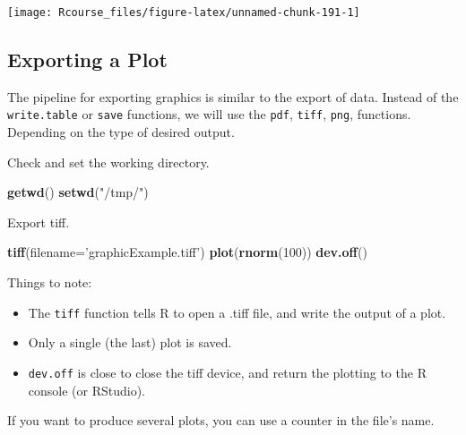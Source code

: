 \documentclass[]{book}
\newenvironment{Shaded}{\begin{snugshade}}{\end{snugshade}}
\newcommand{\KeywordTok}[1]{\textcolor[rgb]{0.13,0.29,0.53}{\textbf{{#1}}}}
\newcommand{\DataTypeTok}[1]{\textcolor[rgb]{0.13,0.29,0.53}{{#1}}}
\newcommand{\DecValTok}[1]{\textcolor[rgb]{0.00,0.00,0.81}{{#1}}}
\newcommand{\StringTok}[1]{\textcolor[rgb]{0.31,0.60,0.02}{{#1}}}
\newcommand{\CommentTok}[1]{\textcolor[rgb]{0.56,0.35,0.01}{\textit{{#1}}}}
\newcommand{\NormalTok}[1]{{#1}}
\providecommand{\tightlist}{%
  \setlength{\itemsep}{0pt}\setlength{\parskip}{0pt}}
\theoremstyle{definition}
\theoremstyle{definition}
\theoremstyle{remark}
\begin{document}
\texttt{[image: Rcourse\_files/figure-latex/unnamed-chunk-191-1]}

\subsection{Exporting a Plot}\label{exporting-a-plot}

The pipeline for exporting graphics is similar to the export of data.
Instead of the \texttt{write.table} or \texttt{save} functions, we will
use the \texttt{pdf}, \texttt{tiff}, \texttt{png}, functions. Depending
on the type of desired output.

Check and set the working directory.

\begin{Shaded}
\begin{Highlighting}[]
\KeywordTok{getwd}\NormalTok{()}
\KeywordTok{setwd}\NormalTok{(}\StringTok{"/tmp/"}\NormalTok{)}
\end{Highlighting}
\end{Shaded}

Export tiff.

\begin{Shaded}
\begin{Highlighting}[]
\KeywordTok{tiff}\NormalTok{(}\DataTypeTok{filename=}\StringTok{'graphicExample.tiff'}\NormalTok{)}
\KeywordTok{plot}\NormalTok{(}\KeywordTok{rnorm}\NormalTok{(}\DecValTok{100}\NormalTok{))}
\KeywordTok{dev.off}\NormalTok{()}
\end{Highlighting}
\end{Shaded}

Things to note:

\begin{itemize}
\tightlist
\item
  The \texttt{tiff} function tells R to open a .tiff file, and write the
  output of a plot.
\item
  Only a single (the last) plot is saved.
\item
  \texttt{dev.off} is close to close the tiff device, and return the
  plotting to the R console (or RStudio).
\end{itemize}

If you want to produce several plots, you can use a counter in the
file's name.

\begin{Shaded}
\end{Shaded}
\end{document}
